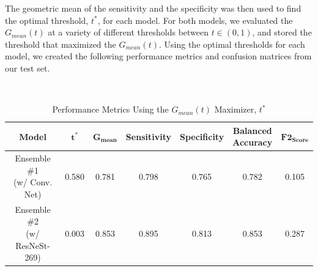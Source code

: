 \documentclass [MAS] {uclathes}
\begin{document}
The geometric mean of the sensitivity and the specificity was then used to find the optimal threshold, $t^*$, for each model. For both models, we evaluated the $G_{mean}(t)$ at a variety of different thresholds between $t \in (0, 1)$, and stored the threshold that maximized the $G_{mean}(t)$. Using the optimal thresholds for each model, we created the following performance metrics and confusion matrices from our test set.

\

\begin{table}[h!]
\centering
\footnotesize 
\begin{tabular}{| c | c | c | c | c | c | c |} 
\hline
\textbf{Model} & $\mathbf{t^*}$ & $\mathbf{G_{mean}}$ & \textbf{Sensitivity} & \textbf{Specificity} & \makecell{\textbf{Balanced} \\ \textbf{Accuracy}} & $\mathbf{F2_{Score}}$ \\ 
\hline
\hline
\makecell{Ensemble \#1 \\ (w/ Conv. Net)} & 0.580 & 0.781 & 0.798 & 0.765 & 0.782 & 0.105\\
\hline
\makecell{Ensemble \#2 \\ (w/ ResNeSt-269)} & 0.003 & 0.853 & 0.895 & 0.813 & 0.853 & 0.287\\
\hline  
\end{tabular}
\label{tab:mods_metrics}
\caption{Performance Metrics Using the $G_{mean}(t)$ Maximizer, $t^*$}
\end{table}
\end{document}
